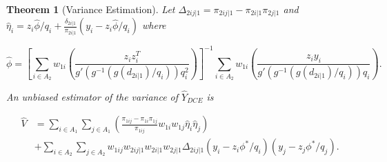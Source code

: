 \documentclass[12pt]{article}
\newtheorem{theorem}{Theorem}
\begin{document}
\begin{theorem}[Variance Estimation]
  Let $\Delta_{2ij|1} = \pi_{2ij|1} - \pi_{2i|1} \pi_{2j|1}$ and 
  $\hat \eta_i = z_i \hat \phi / q_i + \frac{\delta_{2i|1}}{\pi_{2i|1}} \left(y_i
  - z_i \hat \phi / q_i\right)$ where 

  $$\hat \phi = \left[\sum_{i \in A_2} w_{1i}\left(\frac{z_i z_i^T}{
  g'(g^{-1}(g(d_{2i|1}) / q_i))q_i^2}\right)\right]^{-1} \sum_{i \in A_2} w_{1i}
    \left(\frac{z_i y_i}{g'(g^{-1}(g(d_{2i|1}) / q_i)) q_i}\right).$$

  An unbiased estimator of the variance of $\hat Y_{DCE}$ is 

  \begin{align*}
    \hat V 
    &= \sum_{i \in A_1} \sum_{j \in A_1} \left(\frac{\pi_{1ij} -
    \pi_{1i}\pi_{1j}}{\pi_{1ij}}
    w_{1i} w_{1j} \hat \eta_i \hat \eta_j \right) \\ 
    &+ \sum_{i \in A_2} \sum_{j \in A_2} w_{1ij} w_{2ij|1} w_{2i|1} w_{2j|1} 
    \Delta_{2ij|1} (y_i - z_i \phi^* / q_i)(y_j - z_j \phi^* / q_j).
  \end{align*}
\end{theorem}
\end{document}
